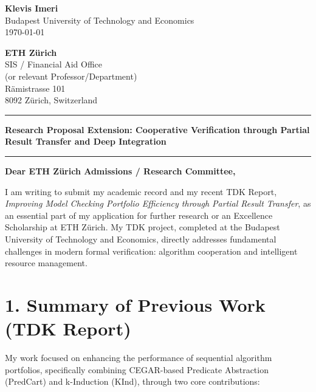 \documentclass[11pt, a4paper]{article}
\begin{document}
\begin{flushright}
\textbf{Klevis Imeri} \\
Budapest University of Technology and Economics \\
\today \\
\end{flushright}

\vspace{1em}

\textbf{ETH Zürich} \\
SIS / Financial Aid Office \\
(or relevant Professor/Department) \\
Rämistrasse 101 \\
8092 Zürich, Switzerland \\

\vspace{1.5em}

\noindent\rule{\linewidth}{0.4pt}
\vspace{0.5em}
\centering
\textbf{\large Research Proposal Extension: Cooperative Verification through Partial Result Transfer and Deep Integration}
\vspace{0.5em}
\noindent\rule{\linewidth}{0.4pt}
\vspace{1.5em}

\textbf{Dear ETH Zürich Admissions / Research Committee,}

I am writing to submit my academic record and my recent TDK Report, \textit{Improving Model Checking Portfolio Efficiency through Partial Result Transfer}, as an essential part of my application for further research or an Excellence Scholarship at ETH Zürich. My TDK project, completed at the Budapest University of Technology and Economics, directly addresses fundamental challenges in modern formal verification: algorithm cooperation and intelligent resource management.

\section*{1. Summary of Previous Work (TDK Report)}

My work focused on enhancing the performance of sequential algorithm portfolios, specifically combining CEGAR-based Predicate Abstraction (PredCart) and k-Induction (KInd), through two core contributions:
\end{document}

